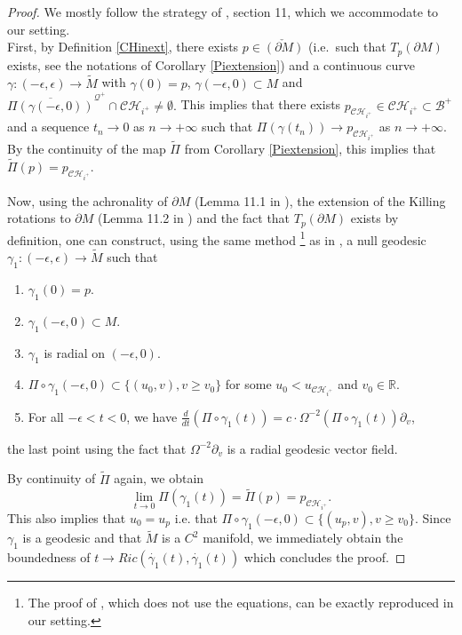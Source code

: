 \documentclass[10pt,a4paper]{article}
\theoremstyle{plain}
\theoremstyle{remark}
\theoremstyle{definition}
\newcommand{\RR}{\mathbb{R}}
\theoremstyle{plain}
\theoremstyle{remark}
\theoremstyle{definition}
\newcommand{\CH}{\mathcal{CH}_{i^+}}
\numberwithin{equation}{section}
\begin{document}
\begin{proof}  	We mostly follow the strategy of \cite{JonathanStab}, section 11, which we accommodate to our setting. \\ First, by Definition \ref{CHinext}, there exists $p \in \check{(\partial M)}$ (i.e.\ such that $T_p (\partial M)$ exists, see the notations of Corollary \ref{Piextension}) and a continuous curve $\gamma:(-\epsilon,\epsilon) \rightarrow \tilde{M}$ with $\gamma(0)=p$, $\gamma(-\epsilon,0) \subset M$ and $ \overline{\Pi(\gamma(-\epsilon,0))}^{\mathcal{Q}^+} \cap \CH \neq \emptyset.$ This implies that there exists $p_{\CH} \in \CH \subset \mathcal{B}^+$ and a sequence $t_n \rightarrow 0$ as $n \rightarrow +\infty$ such that $\Pi( \gamma(t_n)) \rightarrow p_{\CH}$ as $n \rightarrow +\infty$.  By the continuity of the map $\tilde{\Pi}$ from Corollary \ref{Piextension}, this implies that $\tilde{\Pi}(p)=p_{\CH}$.
	
	Now, using the achronality of $\partial M$ (Lemma 11.1 in \cite{JonathanStab}), the extension of the Killing rotations to $\partial M$ (Lemma 11.2 in \cite{JonathanStab})	%
	and the fact that $T_p (\partial M)$ exists by definition, one can construct, using the same method \footnote{The proof of \cite{JonathanStab}, which does not use the equations, can be exactly reproduced in our setting.} as in \cite{JonathanStab}, a null geodesic $\gamma_1:(-\epsilon,\epsilon) \rightarrow \tilde{M}$ such that  \begin{enumerate}
		\item $\gamma_1(0)=p$.
		\item $\gamma_1(-\epsilon,0) \subset M$.
		\item $\gamma_{1}$ is radial on $(-\epsilon,0)$.
		\item  $\Pi \circ \gamma_{1}(-\epsilon,0) \subset \{ (u_0,v), v \geq v_0\}$ for some $u_0<u_{\CH}$ and $v_0 \in \RR$.
		\item For all $-\epsilon < t <0$, we have $\frac{d}{dt}(\Pi \circ \gamma_1(t))=c  \cdot \Omega^{-2}(\Pi \circ \gamma_1(t)) \partial_v$,
	\end{enumerate} the last point using the fact that  $\Omega^{-2} \partial_v$ is a radial geodesic vector field.
	

By continuity of $\tilde{\Pi}$ again, we obtain \color{black} $$ \lim_{ t\rightarrow 0} \Pi(\gamma_1(t))= \tilde{\Pi}(p)=p_{\CH}.$$ This also implies that $u_0=u_p$ i.e. that $\Pi \circ \gamma_{1}(-\epsilon,0) \subset \{ (u_p,v), v \geq v_0\}$. Since $\gamma_1$ is a geodesic and that $\tilde{M}$ is a $C^2$ manifold, we immediately obtain the boundedness of $t \rightarrow Ric(\dot{\gamma_1}(t),\dot{\gamma_1}(t))$ which concludes the proof.
	
	
\end{proof}  
\end{document}
